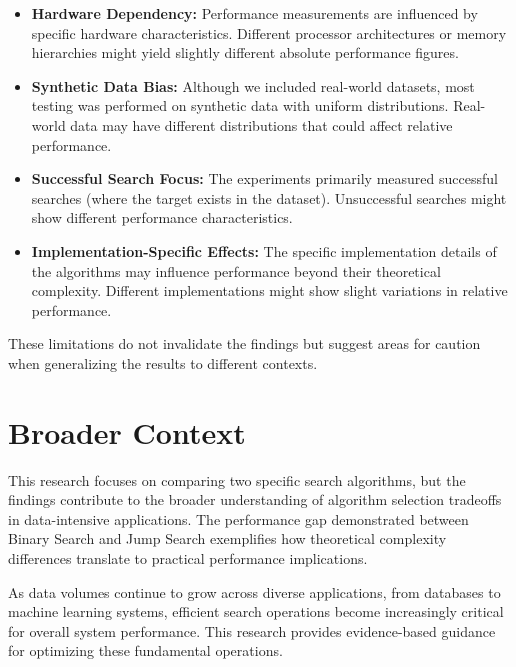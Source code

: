 \begin{itemize}
    \item \textbf{Hardware Dependency:} Performance measurements are influenced by specific hardware characteristics. Different processor architectures or memory hierarchies might yield slightly different absolute performance figures.
    
    \item \textbf{Synthetic Data Bias:} Although we included real-world datasets, most testing was performed on synthetic data with uniform distributions. Real-world data may have different distributions that could affect relative performance.
    
    \item \textbf{Successful Search Focus:} The experiments primarily measured successful searches (where the target exists in the dataset). Unsuccessful searches might show different performance characteristics.
    
    \item \textbf{Implementation-Specific Effects:} The specific implementation details of the algorithms may influence performance beyond their theoretical complexity. Different implementations might show slight variations in relative performance.
\end{itemize}

These limitations do not invalidate the findings but suggest areas for caution when generalizing the results to different contexts.

\section{Broader Context}

This research focuses on comparing two specific search algorithms, but the findings contribute to the broader understanding of algorithm selection tradeoffs in data-intensive applications. The performance gap demonstrated between Binary Search and Jump Search exemplifies how theoretical complexity differences translate to practical performance implications.

As data volumes continue to grow across diverse applications, from databases to machine learning systems, efficient search operations become increasingly critical for overall system performance. This research provides evidence-based guidance for optimizing these fundamental operations.